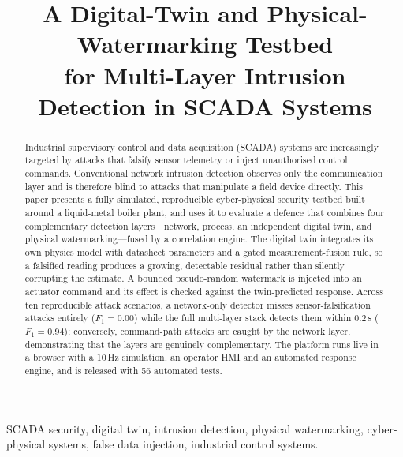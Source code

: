 \documentclass[conference]{IEEEtran}
\begin{document}
\title{A Digital-Twin and Physical-Watermarking Testbed\\ for Multi-Layer Intrusion Detection in SCADA Systems}

\author{%
}

\maketitle

\begin{abstract}
Industrial supervisory control and data acquisition (SCADA) systems are increasingly targeted by attacks that falsify sensor telemetry or inject unauthorised control commands. Conventional network intrusion detection observes only the communication layer and is therefore blind to attacks that manipulate a field device directly. This paper presents a fully simulated, reproducible cyber-physical security testbed built around a liquid-metal boiler plant, and uses it to evaluate a defence that combines four complementary detection layers---network, process, an independent digital twin, and physical watermarking---fused by a correlation engine. The digital twin integrates its own physics model with datasheet parameters and a gated measurement-fusion rule, so a falsified reading produces a growing, detectable residual rather than silently corrupting the estimate. A bounded pseudo-random watermark is injected into an actuator command and its effect is checked against the twin-predicted response. Across ten reproducible attack scenarios, a network-only detector misses sensor-falsification attacks entirely ($F_1=0.00$) while the full multi-layer stack detects them within $0.2$\,s ($F_1=0.94$); conversely, command-path attacks are caught by the network layer, demonstrating that the layers are genuinely complementary. The platform runs live in a browser with a 10\,Hz simulation, an operator HMI and an automated response engine, and is released with 56 automated tests.
\end{abstract}

\begin{IEEEkeywords}
SCADA security, digital twin, intrusion detection, physical watermarking, cyber-physical systems, false data injection, industrial control systems.
\end{IEEEkeywords}
\end{document}
